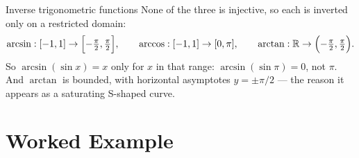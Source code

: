 \begin{rulebox}{Inverse trigonometric functions}
None of the three is injective, so each is inverted only on a restricted
domain:
\[
  \arcsin:[-1,1]\to\Bigl[-\tfrac{\pi}{2},\tfrac{\pi}{2}\Bigr],\qquad
  \arccos:[-1,1]\to[0,\pi],\qquad
  \arctan:\mathbb{R}\to\Bigl(-\tfrac{\pi}{2},\tfrac{\pi}{2}\Bigr).
\]
So $\arcsin(\sin x)=x$ only for $x$ in that range: $\arcsin(\sin\pi)=0$,
not $\pi$. And $\arctan$ is bounded, with horizontal asymptotes
$y=\pm\pi/2$ --- the reason it appears as a saturating S-shaped curve.
\end{rulebox}

\section{Worked Example}

